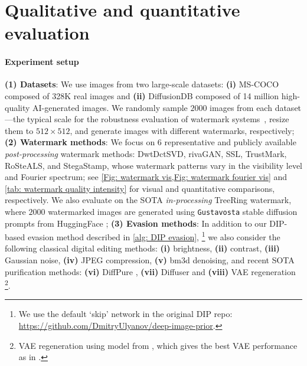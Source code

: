 \section{Qualitative and quantitative evaluation}
\label{Sec: exp and results}

\paragraph{Experiment setup}
\textbf{(1) Datasets}: We use images from two large-scale datasets: \textbf{(i)} MS-COCO \citep{lin2014microsoft} composed of 328K real images and \textbf{(ii)} DiffusionDB \citep{wang2022diffusiondb} composed of 14 million high-quality AI-generated images. We randomly sample $2000$ images from each dataset---the typical scale for the robustness evaluation of watermark systems~\citep{an2024benchmarking}, resize them to $512 \times 512$, and generate images with different watermarks, respectively; \textbf{(2) Watermark methods}: We focus on $6$ representative and publicly available \emph{post-processing} watermark methods: DwtDctSVD, rivaGAN, SSL, TrustMark, RoSteALS, and StegaStamp, whose watermark patterns vary in the visibility level and Fourier spectrum; see \cref{Fig: watermark vis,Fig: watermark fourier vis} and \cref{tab: watermark quality intensity} for visual and quantitative comparisons, respectively. We also evaluate on the SOTA \emph{in-processing} TreeRing watermark, where $2000$ watermarked images are generated using \texttt{Gustavosta} stable diffusion prompts from HuggingFace \citep{huggingface2024gustavosta}; \textbf{(3) Evasion methods}: In addition to our DIP-based evasion method described in \cref{alg: DIP evasion}, \footnote{We use the default `skip' network in the original DIP repo: \url{https://github.com/DmitryUlyanov/deep-image-prior}.} we also consider the following classical digital editing methods: \textbf{(i)} brightness, \textbf{(ii)} contrast, \textbf{(iii)} Gaussian noise, \textbf{(iv)} JPEG compression, \textbf{(v)} bm3d denoising, and recent SOTA purification methods: \textbf{(vi)} DiffPure \citep{saberi2023robustness}, \textbf{(vii)} Diffuser and \textbf{(viii)} VAE regeneration \citep{jiang2023evading}\footnote{VAE regeneration using model from \cite{cheng2020learned}, which gives the best VAE performance as in \cite{jiang2023evading}.}.



